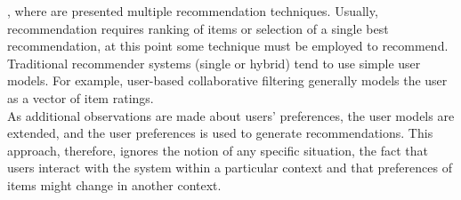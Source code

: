 \cite{tran2000hybrid}, where are presented multiple recommendation
techniques. Usually, recommendation requires ranking of
items or selection of a single best recommendation, at this point some
technique must be employed to recommend. \\ 
Traditional recommender systems (single or hybrid) tend to use
simple user models. For example, user-based collaborative filtering
generally models the user as a vector of item ratings. \\ As additional
observations are made about users' preferences, the user models are
extended, and the user preferences is used to generate
recommendations. This approach, therefore, ignores the notion of any
specific situation, the fact that users interact with the system
within a particular context and  that preferences of items might 
change in another context. 

